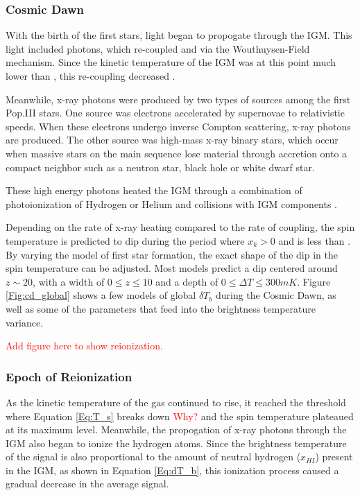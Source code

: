 \subsubsection{Cosmic Dawn}
With the birth of the first stars, light began to propogate through the IGM. This light included \lya photons, which re-coupled \ts and \tk via the Wouthuysen-Field mechanism. Since the kinetic temperature of the IGM was at this point much lower than \tg, this re-coupling decreased \ts. 

Meanwhile, x-ray photons were produced by two types of sources among the first Pop.III stars. One source was electrons accelerated by supernovae to relativistic speeds. When these electrons undergo inverse Compton scattering, x-ray photons are produced. The other source was high-mass x-ray binary stars, which occur when massive stars on the main sequence lose material through accretion onto a compact neighbor such as a neutron star, black hole or white dwarf star. 

These high energy photons heated the IGM through a combination of photoionization of Hydrogen or Helium and collisions with IGM components \cite{furlanetto_2006}. 

Depending on the rate of x-ray heating compared to the rate of \lya coupling, the spin temperature is predicted to dip during the period where $x_k>0$ and \tk is less than \tg. By varying the model of first star formation, the exact shape of the dip in the spin temperature can be adjusted. Most models predict a dip centered around $z\sim20$, with a width of $0 \leq z \leq 10$ and a depth of $0\leq \Delta T \leq 300 mK$. Figure \ref{Fig:cd_global} shows a few models of global $\delta T_b$  during the Cosmic Dawn, as well as some of the parameters that feed into the brightness temperature variance. 

\textcolor{red}{Add figure here to show reionization.}

\subsubsection{Epoch of Reionization}
As the kinetic temperature of the gas continued to rise, it reached the threshold where Equation \ref{Eq:T_s} breaks down \textcolor{red}{Why?} and the spin temperature plateaued at its maximum level. Meanwhile, the propogation of x-ray photons through the IGM also began to ionize the hydrogen atoms. Since the brightness temperature of the \cm signal is also proportional to the amount of neutral hydrogen ($x_{HI}$) present in the IGM, as shown in Equation \ref{Eq:dT_b}, this ionization process caused a gradual decrease in the average \cm signal. 

